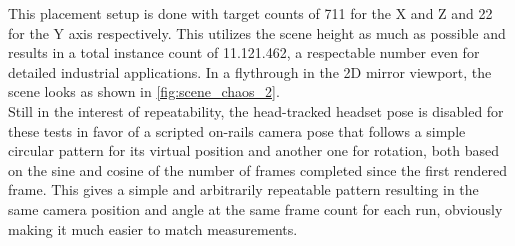 This placement setup is done with target counts of 711 for the X and Z and 22 for the Y axis respectively. This utilizes the scene height as much as possible and results in a total instance count of 11.121.462, a respectable number even for detailed industrial applications. In a flythrough in the 2D mirror viewport, the scene looks as shown in \autoref{fig:scene_chaos_2}. \\
Still in the interest of repeatability, the head-tracked headset pose is disabled for these tests in favor of a scripted on-rails camera pose that follows a simple circular pattern for its virtual position and another one for rotation, both based on the sine and cosine of the number of frames completed since the first rendered frame. This gives a simple and arbitrarily repeatable pattern resulting in the same camera position and angle at the same frame count for each run, obviously making it much easier to match measurements. 

